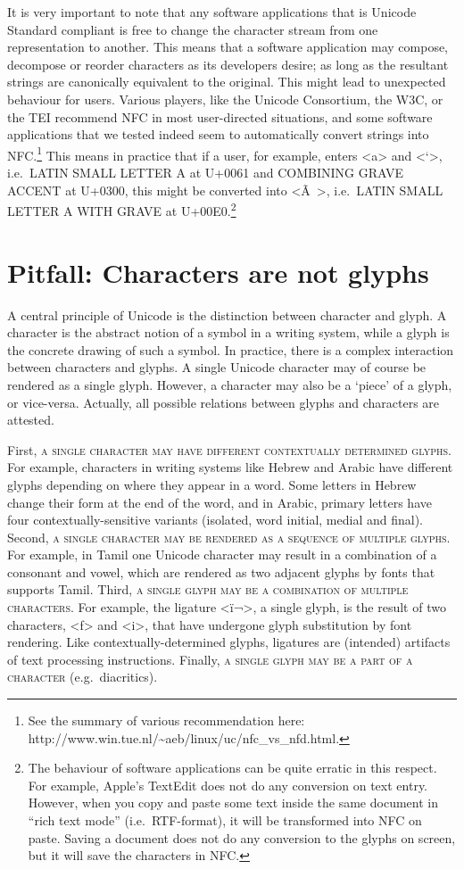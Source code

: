 It is very important to note that any software applications that is Unicode Standard compliant is free to change the character stream from one representation to another. This means that a software application may compose, decompose or reorder characters as its developers desire; as long as the resultant strings are canonically equivalent to the original. This might lead to unexpected behaviour for users. Various players, like the Unicode Consortium, the W3C, or the TEI recommend NFC in most user-directed situations, and some software applications that we tested indeed seem to automatically convert strings into NFC.\footnote{See the summary of various recommendation here: http://www.win.tue.nl/\textasciitilde{}aeb/linux/uc/nfc\_vs\_nfd.html. } This means in practice that if a user, for example, enters <a> and <`>, i.e.~LATIN SMALL LETTER A at U+0061 and COMBINING GRAVE ACCENT at U+0300, this might be converted into <Ã >, i.e.~LATIN SMALL LETTER A WITH GRAVE at U+00E0.\footnote{The behaviour of software applications can be quite erratic in this respect. For example, Apple's TextEdit does not do any conversion on text entry. However, when you copy and paste some text inside the same document in ``rich text mode'' (i.e.~RTF-format), it will be transformed into NFC on paste. Saving a document does not do any conversion to the glyphs on screen, but it will save the characters in NFC.}

\section{Pitfall: Characters are not glyphs}
\label{pitfall-characters-are-not-glyphs}

A central principle of Unicode is the distinction between character and glyph. A character is the abstract notion of a symbol in a writing system, while a glyph is the concrete drawing of such a symbol. In practice, there is a complex interaction between characters and glyphs. A single Unicode character may of course be rendered as a single glyph. However, a character may also be a `piece' of a glyph, or vice-versa. Actually, all possible relations between glyphs and characters are attested.

First, \textsc{a single character may have different contextually determined glyphs.} For example, characters in writing systems like Hebrew and Arabic have different glyphs depending on where they appear in a word. Some letters in Hebrew change their form at the end of the word, and in Arabic, primary letters have four contextually-sensitive variants (isolated, word initial, medial and final). Second, \textsc{a single character may be rendered as a sequence of multiple glyphs.} For example, in Tamil one Unicode character may result in a combination of a consonant and vowel, which are rendered as two adjacent glyphs by fonts that supports Tamil. Third, \textsc{a single glyph may be a combination of multiple characters. }For example, the ligature <ï¬>, a single glyph, is the result of two characters, <f> and <i>, that have undergone glyph substitution by font rendering. Like contextually-determined glyphs, ligatures are (intended) artifacts of text processing instructions. Finally, \textsc{a single glyph may be a part of a character} (e.g.~diacritics).

